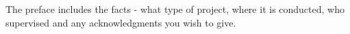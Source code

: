 The preface includes the facts - what type of project, where it is conducted, who supervised and any acknowledgments you wish to give.